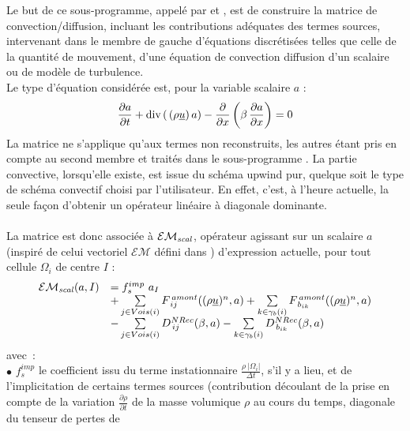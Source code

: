 Le but de ce sous-programme, appel\'e par  et , est de construire la
matrice de convection/diffusion, incluant les contributions ad\'equates des termes sources,
intervenant dans le membre de gauche d'\'equations discr\'etis\'ees telles que
celle de la
quantit\'e de mouvement, d'une \'equation de convection diffusion d'un scalaire
ou de mod\`ele de turbulence.\\
Le type d'\'equation consid\'er\'ee est, pour la variable scalaire $a$ :
\begin{equation}\notag
\displaystyle \frac{\partial a}{\partial t} + \text{div}\, (\,(\rho \underline{u})\, a) -
\displaystyle \frac{\partial }{\partial x}\left(\beta\,\frac{\partial a}{\partial x}\right) = 0
\end{equation}
La matrice ne s'applique qu'aux termes non reconstruits, les autres \'etant pris en compte au second membre et
trait\'es dans le sous-programme . La partie
convective, lorsqu'elle existe, est issue du sch\'ema upwind pur, quelque soit
le type de sch\'ema convectif choisi par l'utilisateur. En effet, c'est, \`a
l'heure actuelle, la seule fa\c con d'obtenir un op\'erateur lin\'eaire à
diagonale dominante.\\\\
La matrice est donc associ\'ee \`a $\mathcal{EM_{\it{scal}}}$, op\'erateur
agissant sur un scalaire $a$ (inspir\'e de celui vectoriel $\mathcal{EM}$
d\'efini dans ) d'expression actuelle, pour tout cellule $\Omega_i$ de
centre $I$  :
\begin{equation}\notag
\begin{array}{lll}
\mathcal{EM_{\it{scal}}}(a,I) &=  f_s^{imp}\ a_I\ \\
&+\sum\limits_{j\in Vois(i)}{F^{\,amont}_{\,ij}((\rho\underline{u})^n,a)}
+\sum\limits_{k\in {\gamma_b(i)}} {F^{\,amont}_{\,{b}_{ik}}((\rho
\underline{u})^n,a)}\\
&-\sum\limits_{j\in Vois(i)}{D^{NRec}_{\,ij}(\beta,a)}
-\sum\limits_{k\in {\gamma_b(i)}} {D^{NRec}_{\,{b}_{ik}}(\beta,a)}\\
\end{array}
\end{equation}
avec~:\\
$\bullet$ $f_s^{imp}$ le coefficient issu du terme instationnaire
$\displaystyle\frac{\rho \ |\Omega_i|}{\Delta t}$, s'il y a lieu, et de
l'implicitation de certains termes sources (contribution d\'ecoulant de la prise
en compte de la
variation $\displaystyle\frac{\partial \rho }{\partial t}$ de
la masse volumique $\rho$ au cours du temps, diagonale du tenseur de pertes de
